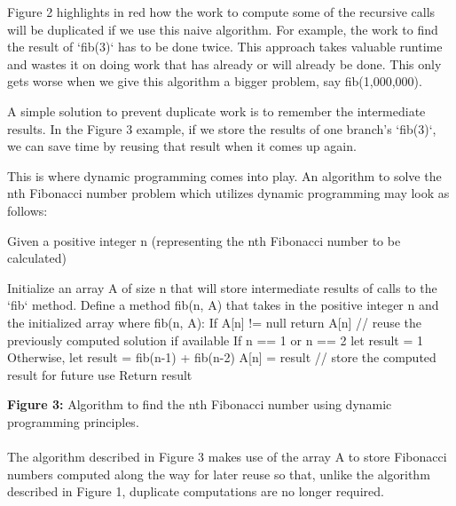 \documentclass[12pt,letterpaper]{article}
\begin{document}
Figure 2 highlights in red how the work to compute some of the recursive calls will be duplicated if we use this naive algorithm. For example, the work to find the result of `fib(3)` has to be done twice. This approach takes valuable runtime and wastes it on doing work that has already or will already be done. This only gets worse when we give this algorithm a bigger problem, say fib(1,000,000).

A simple solution to prevent duplicate work is to remember the intermediate results. In the Figure 3 example, if we store the results of one branch’s `fib(3)`, we can save time by reusing that result when it comes up again.

This is where dynamic programming comes into play. An algorithm to solve the nth Fibonacci number problem which utilizes dynamic programming may look as follows:

\begin{small}
    \begin{spverbatim}
    Given a positive integer n (representing the 
    nth Fibonacci number to be calculated)

        Initialize an array A of size n that will store intermediate results 
        of calls to the `fib` method.
        Define a method fib(n, A) that takes in the positive integer n 
        and the initialized array where
            fib(n, A):
                If A[n] != null return A[n] 
                // reuse the previously computed solution if available
                If n == 1 or n == 2 let result = 1
                Otherwise, let result = fib(n-1) + fib(n-2)
                A[n] = result // store the computed result for future use
                Return result
    \end{spverbatim}
\end{small}

\begin{footnotesize}
    \textbf{Figure 3:} Algorithm to find the nth Fibonacci number using dynamic programming principles.
\end{footnotesize}
\paragraph{}

The algorithm described in Figure 3 makes use of the array A to store Fibonacci numbers computed along the way for later reuse so that, unlike the algorithm described in Figure 1, duplicate computations are no longer required.
\end{document}

